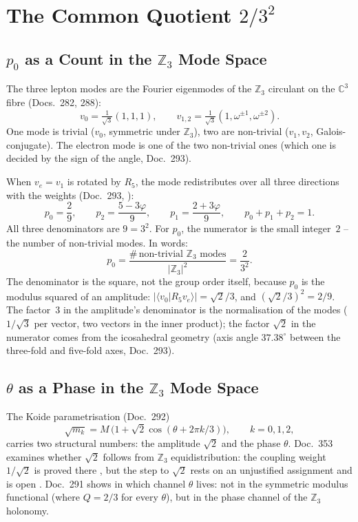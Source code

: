 \section{The Common Quotient $2/3^2$}

\subsection{$p_0$ as a Count in the $\mathbb{Z}_3$ Mode Space}

The three lepton modes are the Fourier eigenmodes of the $\mathbb{Z}_3$ circulant on the
$\mathbb{C}^3$ fibre (Docs.~282, 288):
\[
  v_0 = \tfrac{1}{\sqrt3}(1,1,1),\qquad
  v_{1,2} = \tfrac{1}{\sqrt3}(1,\omega^{\pm1},\omega^{\pm2}).
\]
One mode is trivial ($v_0$, symmetric under $\mathbb{Z}_3$), two are non-trivial
($v_1,v_2$, Galois-conjugate). The electron mode is one of the two non-trivial ones (which
one is decided by the sign of the angle, Doc.~293).

When $v_e = v_1$ is rotated by $R_5$, the mode redistributes over all three directions with
the weights (Doc.~293, \BM):
\[
  p_0 = \frac{2}{9},\qquad
  p_2 = \frac{5-3\varphi}{9},\qquad
  p_1 = \frac{2+3\varphi}{9},\qquad
  p_0+p_1+p_2 = 1.
\]
All three denominators are $9 = 3^2$. For $p_0$, the numerator is the small integer~$2$ --
the number of non-trivial modes. In words:
\[
  p_0 = \frac{\#\,\text{non-trivial }\mathbb{Z}_3\text{ modes}}{|\mathbb{Z}_3|^2}
  = \frac{2}{3^2}.
\]
The denominator is the square, not the group order itself, because $p_0$ is the modulus
squared of an amplitude: $|\langle v_0|R_5 v_e\rangle| = \sqrt{2}/3$, and
$(\sqrt2/3)^2 = 2/9$. The factor~$3$ in the amplitude's denominator is the normalisation of
the modes ($1/\sqrt3$ per vector, two vectors in the inner product); the factor $\sqrt2$ in the
numerator comes from the icosahedral geometry (axis angle $37.38^\circ$ between the three-fold
and five-fold axes, Doc.~293).

\subsection{$\theta$ as a Phase in the $\mathbb{Z}_3$ Mode Space}

The Koide parametrisation (Doc.~292)
\[
  \sqrt{m_k} = M\,\bigl(1+\sqrt2\cos(\theta + 2\pi k/3)\bigr),\qquad k=0,1,2,
\]
carries two structural numbers: the amplitude $\sqrt2$ and the phase $\theta$. Doc.~353 examines
whether $\sqrt2$ follows from $\mathbb{Z}_3$ equidistribution: the coupling weight $1/\sqrt2$
is proved there \BM, but the step to $\sqrt2$ rests on an unjustified assignment and
is open \SM. Doc.~291 shows in which channel
$\theta$ lives: not in the symmetric modulus functional (where $Q = 2/3$ for every $\theta$),
but in the phase channel of the $\mathbb{Z}_3$ holonomy.

